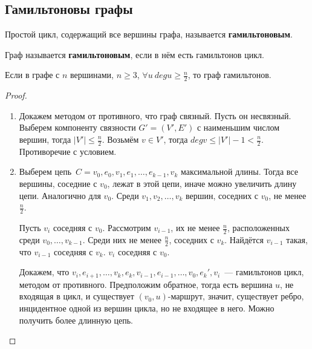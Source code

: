 



\subsection{Гамильтоновы графы}
\begin{definition}
	Простой цикл, содержащий все вершины графа, называется \textbf{гамильтоновым}.
\end{definition}

\begin{definition}
	Граф называется \textbf{гамильтоновым}, если в нём есть гамильтонов цикл.
\end{definition}

\begin{theorem}[Дирака]
	Если в графе с $n$ вершинами, $n \geqslant 3$, $\forall u \ deg u \geqslant \frac{n}2$, то граф гамильтонов.
\end{theorem}
\begin{proof}
\begin{enumerate}
	\item Докажем методом от противного, что граф связный. Пусть он несвязный. Выберем компоненту
	связности $G' = (V', E')$ с наименьшим числом вершин, тогда $|V'| \leqslant \frac{n}2$.
	Возьмём $v \in V'$, тогда $deg v \leqslant |V'| - 1 < \frac{n}2$. Противоречие с условием.
	\item Выберем цепь~$C = v_0, e_0, v_1, e_1, \ldots, e_{k-1}, v_k$ максимальной длины. Тогда все вершины, соседние с $v_0$, лежат в этой цепи, иначе можно увеличить длину цепи. Аналогично для $v_0$. Среди $v_1, v_2, \ldots, v_k$ вершин, соседних с $v_0$, не менее $\frac{n}2$.
	
	Пусть $v_i$ соседняя с $v_0$. Рассмотрим $v_{i-1}$, их не менее $\frac{n}2$, расположенных среди $v_0, \ldots, v_{k-1}$. Среди них не менее $\frac{n}2$, соседних с $v_k$. Найдётся $v_{i-1}$ такая, что $v_{i-1}$ соседняя с $v_k$. $v_i$ соседняя с $v_0$.
	
	Докажем, что $v_i, e_{i+1}, \ldots, v_k, e_k, v_{i-1}, e_{i-1}, \ldots, v_0, e_k', v_i$~---
	гамильтонов цикл, методом от противного. Предположим обратное, тогда есть вершина $u$, не входящая в цикл, и существует $(v_0, u)$-маршрут, значит, существует ребро, инцидентное одной из вершин цикла, но не входящее в него. Можно получить более длинную цепь.
\end{enumerate}
\end{proof}